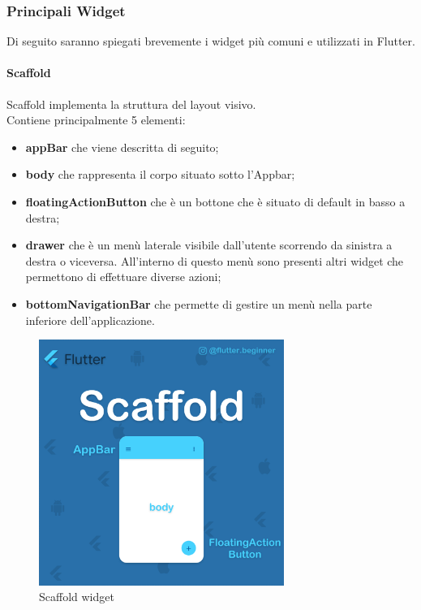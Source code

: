 \newpage

\subsubsection{Principali Widget}
Di seguito saranno spiegati brevemente i widget più comuni e utilizzati in Flutter.

\paragraph{Scaffold}
Scaffold \cite{scaffold} implementa la struttura del layout visivo.\\
Contiene principalmente 5 elementi:
\begin{itemize}
	\item \textbf{appBar} che viene descritta di seguito;   
	\item \textbf{body} che rappresenta il corpo situato sotto l'Appbar;
	\item \textbf{floatingActionButton} che è un bottone che è situato di default in basso a destra;   
	\item \textbf{drawer} che è un menù laterale visibile dall'utente scorrendo da sinistra a destra o viceversa. All'interno di questo menù sono presenti altri widget che permettono di effettuare diverse azioni;
	\item \textbf{bottomNavigationBar} che permette di gestire un menù nella parte inferiore dell'applicazione.
\end{itemize}

\begin{figure}[htbp]	
	\centering
	\includegraphics[width=8cm]{immagini/scaffold.png}
	\caption{Scaffold widget}
	\label{fig:Scaffold widget}
\end{figure}

